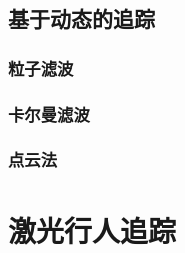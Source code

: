 \subsection{基于动态的追踪}

\subsubsection{粒子滤波}

\subsubsection{卡尔曼滤波}

\subsubsection{点云法}

\section{激光行人追踪}


